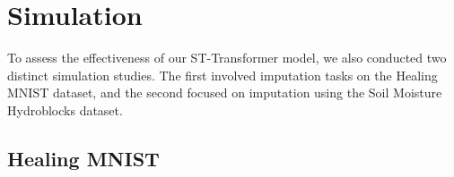 \documentclass[11pt]{article}
\begin{document}
%
%
%
%
%



\appendix


\section{Simulation} 
To assess the effectiveness of our ST-Transformer model, we also conducted two distinct simulation studies. The first involved imputation tasks on the Healing MNIST dataset, and the second focused on imputation using the Soil Moisture Hydroblocks dataset.



\subsection{Healing MNIST}
\end{document}
